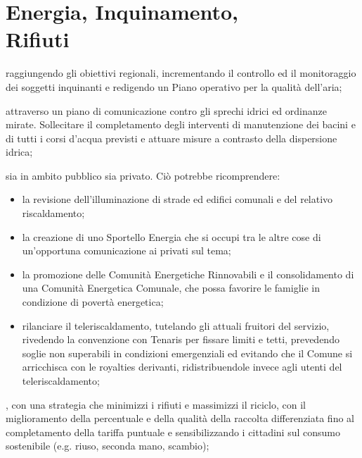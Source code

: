\section[Energia, Inquinamento, Rifiuti]{Energia, Inquinamento,\\Rifiuti}
 raggiungendo gli obiettivi regionali, incrementando il controllo ed il monitoraggio dei soggetti inquinanti e redigendo un Piano operativo per la qualità dell'aria; 

 attraverso un piano di comunicazione contro gli sprechi idrici ed ordinanze mirate. Sollecitare il completamento degli interventi di manutenzione dei bacini e di tutti i corsi d'acqua previsti e attuare misure a contrasto della dispersione idrica;

\begin{bluebox}
 sia in ambito pubblico sia privato. Ciò potrebbe ricomprendere:
\begin{itemize}
  \item la revisione dell'illuminazione di strade ed edifici comunali e del relativo riscaldamento;
  \item la creazione di uno Sportello Energia che si occupi tra le altre cose di un'opportuna comunicazione ai privati sul tema; 
  \item la promozione delle Comunità Energetiche Rinnovabili e il consolidamento di una Comunità Energetica Comunale, che possa favorire le famiglie in condizione di povertà energetica;  
  \item rilanciare il teleriscaldamento, tutelando gli attuali fruitori del servizio, rivedendo la convenzione con Tenaris per fissare limiti e tetti, prevedendo soglie non superabili in condizioni emergenziali ed evitando che il Comune si arricchisca con le royalties derivanti, ridistribuendole invece agli utenti del teleriscaldamento; 
\end{itemize} 
\end{bluebox}

, con una strategia che minimizzi i rifiuti e massimizzi il riciclo, con il miglioramento della percentuale e della qualità della raccolta differenziata fino al completamento della tariffa puntuale e sensibilizzando i cittadini sul consumo sostenibile (e.g. riuso, seconda mano, scambio);


